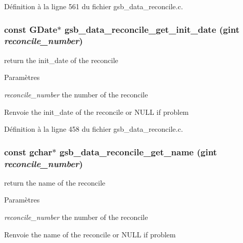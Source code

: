 Définition à la ligne 561 du fichier gsb\_\-data\_\-reconcile.c.

\subsubsection[{gsb\_\-data\_\-reconcile\_\-get\_\-init\_\-date}]{\setlength{\rightskip}{0pt plus 5cm}const GDate$\ast$ gsb\_\-data\_\-reconcile\_\-get\_\-init\_\-date (gint {\em reconcile\_\-number})}\label{gsb__data__reconcile_8h_a34a53feb10b93744a7230407d599b788}
return the init\_\-date of the reconcile


\begin{DoxyParams}{Paramètres}
\item[{\em reconcile\_\-number}]the number of the reconcile\end{DoxyParams}
\begin{DoxyReturn}{Renvoie}
the init\_\-date of the reconcile or NULL if problem 
\end{DoxyReturn}


Définition à la ligne 458 du fichier gsb\_\-data\_\-reconcile.c.

\subsubsection[{gsb\_\-data\_\-reconcile\_\-get\_\-name}]{\setlength{\rightskip}{0pt plus 5cm}const gchar$\ast$ gsb\_\-data\_\-reconcile\_\-get\_\-name (gint {\em reconcile\_\-number})}\label{gsb__data__reconcile_8h_a0f88a3f39b7944967f373097fe9d1474}
return the name of the reconcile


\begin{DoxyParams}{Paramètres}
\item[{\em reconcile\_\-number}]the number of the reconcile\end{DoxyParams}
\begin{DoxyReturn}{Renvoie}
the name of the reconcile or NULL if problem 
\end{DoxyReturn}


